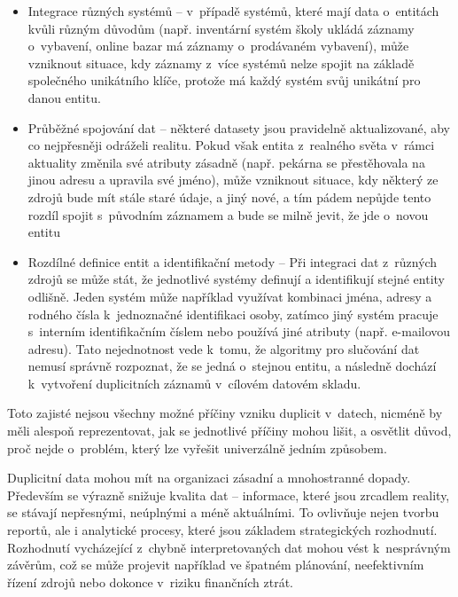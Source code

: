 \begin{itemize}
  \item Integrace různých systémů – v~případě systémů, které mají data o~entitách kvůli různým důvodům (např. inventární systém školy ukládá záznamy o~vybavení, online bazar má záznamy o~prodávaném vybavení), může vzniknout situace, kdy záznamy z~více systémů nelze spojit na základě společného unikátního klíče, protože má každý systém svůj unikátní pro danou entitu.
  \item Průběžné spojování dat – některé datasety jsou pravidelně aktualizované, aby co nejpřesněji odráželi realitu. Pokud však entita z~realného světa v~rámci aktuality změnila své atributy zásadně (např. pekárna se přestěhovala na jinou adresu a upravila své jméno), může vzniknout situace, kdy některý ze zdrojů bude mít stále staré údaje, a jiný nové, a tím pádem nepůjde tento rozdíl spojit s~původním záznamem a bude se milně jevit, že jde o~novou entitu
  \item Rozdílné definice entit a identifikační metody – Při integraci dat z~různých zdrojů se může stát, že jednotlivé systémy definují a identifikují stejné entity odlišně. Jeden systém může například využívat kombinaci jména, adresy a rodného čísla k~jednoznačné identifikaci osoby, zatímco jiný systém pracuje s~interním identifikačním číslem nebo používá jiné atributy (např. e-mailovou adresu). Tato nejednotnost vede k~tomu, že algoritmy pro slučování dat nemusí správně rozpoznat, že se jedná o~stejnou entitu, a následně dochází k~vytvoření duplicitních záznamů v~cílovém datovém skladu.
\end{itemize}

Toto zajisté nejsou všechny možné příčiny vzniku duplicit v~datech, nicméně by měli alespoň reprezentovat, jak se jednotlivé příčiny mohou lišit, a osvětlit důvod, proč nejde o~problém, který lze vyřešit univerzálně jedním způsobem.



Duplicitní data mohou mít na organizaci zásadní a mnohostranné dopady. Především se výrazně snižuje kvalita dat – informace, které jsou zrcadlem reality, se stávají nepřesnými, neúplnými a méně aktuálními. To ovlivňuje nejen tvorbu reportů, ale i analytické procesy, které jsou základem strategických rozhodnutí. Rozhodnutí vycházející z~chybně interpretovaných dat mohou vést k~nesprávným závěrům, což se může projevit například ve špatném plánování, neefektivním řízení zdrojů nebo dokonce v~riziku finančních ztrát.

